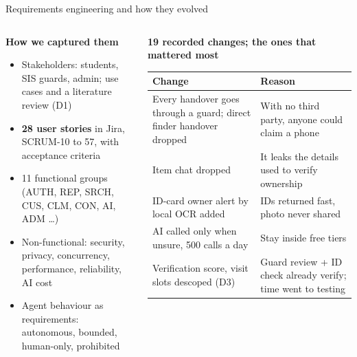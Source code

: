 \documentclass[aspectratio=169,10pt]{beamer}
\newcommand{\head}[1]{{\footnotesize\bfseries\color{branddark}#1}\par\vspace{1pt}}
\begin{document}
\begin{frame}[t]{Requirements engineering and how they evolved}
\begin{columns}[T,onlytextwidth]
\begin{column}{0.37\textwidth}
\head{How we captured them}
\begin{itemize}\setlength{\itemsep}{1pt}\scriptsize
\item Stakeholders: students, SIS guards, admin; use cases and a literature review (D1)
\item \textbf{28 user stories} in Jira, SCRUM-10 to 57, with acceptance criteria
\item 11 functional groups (AUTH, REP, SRCH, CUS, CLM, CON, AI, ADM \dots)
\item Non-functional: security, privacy, concurrency, performance, reliability, AI cost
\item Agent behaviour as requirements: autonomous, bounded, human-only, prohibited
\end{itemize}
\vspace{6pt}
\end{column}
\begin{column}{0.59\textwidth}
\head{19 recorded changes; the ones that mattered most}
\scriptsize
\renewcommand{\arraystretch}{1.28}
\begin{tabular}{@{}L{3.5cm}L{4.2cm}@{}}
\toprule
\textbf{Change} & \textbf{Reason} \\
\midrule
Every handover goes through a guard; direct finder handover dropped & With no third party, anyone could claim a phone \\
Item chat dropped & It leaks the details used to verify ownership \\
ID-card owner alert by local OCR added & IDs returned fast, photo never shared \\
AI called only when unsure, 500 calls a day & Stay inside free tiers \\
Verification score, visit slots descoped (D3) & Guard review + ID check already verify; time went to testing \\
\bottomrule
\end{tabular}
\end{column}
\end{columns}
\end{frame}
\end{document}
